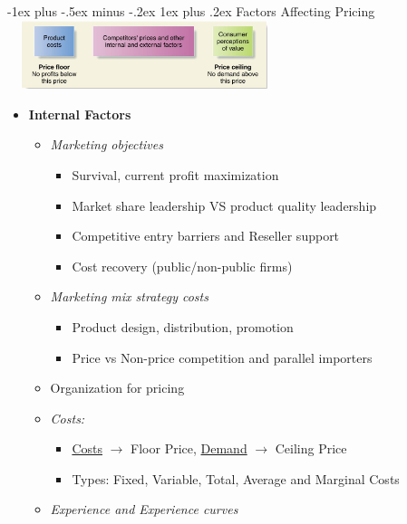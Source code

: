 \documentclass[10pt,landscape]{article}
\makeatletter
\newcommand{\subsubsubsection}{\@startsection{subsubsection}{3}{0mm}%
                                {-1ex plus -.5ex minus -.2ex}%
                                {1ex plus .2ex}%
                                {\normalfont\scriptsize\bfseries}}
\makeatother
\begin{document}
\begin{multicols*}{3}
\subsubsubsection{Factors Affecting Pricing}
\includegraphics*[width=8cm, height=2cm]{images/settingprice.PNG}
\begin{itemize}[topsep=0pt,noitemsep,wide=0pt, leftmargin=\dimexpr{} + 2\relax]
    \item \textbf{Internal Factors}
    \begin{itemize}[topsep=0pt,noitemsep,wide=0pt, leftmargin=\dimexpr{} + 2\relax]
        \item \textit{Marketing objectives}
        \begin{itemize}[topsep=0pt,noitemsep,wide=0pt, leftmargin=\dimexpr{} + 2\relax]
            \item Survival, current profit maximization
            \item Market share leadership VS product quality leadership
            \item Competitive entry barriers and Reseller support
            \item Cost recovery (public/non-public firms)
        \end{itemize}
        \item \textit{Marketing mix strategy costs}
        \begin{itemize}[topsep=0pt,noitemsep,wide=0pt, leftmargin=\dimexpr{} + 2\relax]
            \item Product design, distribution, promotion
            \item Price vs Non-price competition and parallel importers
        \end{itemize}
        \item Organization for pricing
        \item \textit{Costs:}
        \begin{itemize}[topsep=0pt,noitemsep,wide=0pt, leftmargin=\dimexpr{} + 2\relax]
            \item \underline{Costs} $\rightarrow$ Floor Price, \underline{Demand} $\rightarrow$ Ceiling Price
            \item Types: Fixed, Variable, Total, Average and Marginal Costs
        \end{itemize}
        \item \textit{Experience and Experience curves}

\end{itemize}
\end{itemize}
\end{multicols*}
\end{document}
